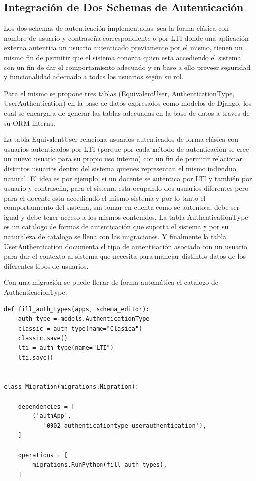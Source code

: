 \subsection{Integración de Dos Schemas de Autenticación}
Los dos schemas de autenticación implementadas, sea la forma clásica con nombre de usuario y contraseña correspondiente o por LTI  donde una aplicación externa autentica un usuario autenticado previamente por el mismo, tienen un mismo fin de permitir que el sistema conozca quien esta accediendo el sistema con un fin de dar el comportamiento adecuado y en base a ello proveer seguridad y funcionalidad adecuado a todos los usuarios según su rol.

Para el mismo se propone tres tablas (EquivalentUser, AuthenticationType, UserAuthentication) en la base de datos expresados como modelos de Django, los cual se encargara de generar las tablas adecuadas en la base de datos a traves de su ORM interna.

La tabla EquivalentUser relaciona usuarios autenticados de forma clásica con usuarios autenticados por LTI  (porque por cada método de autenticación se cree un nuevo usuario para su propio uso interno) con un fin de permitir relacionar distintos usuarios dentro del sistema quienes representan el mismo individuo natural. El idea es por ejemplo, si un docente se autentica por LTI  y también por usuario y contraseña, para el sistema esta ocupando dos usuarios diferentes pero para el docente esta accediendo el mismo sistema y por lo tanto el comportamiento del sistema, sin tomar en cuenta como se autentica, debe ser igual y debe tener acceso a los mismos contenidos. La tabla AuthenticationType es un catalogo de formas de autenticación que suporta el sistema y por su naturaleza de catalogo se llena con las migraciones. Y finalmente la tabla UserAuthentication documenta el tipo de autenticación asociado con un usuario para dar el contexto al sistema que necesita para manejar distintos datos de los diferentes tipos de usuarios.

Con una migración se puede llenar de forma automática el catalogo de AuthenticacionType:
\lstset{language=Python}
\begin{lstlisting}
def fill_auth_types(apps, schema_editor):
    auth_type = models.AuthenticationType
    classic = auth_type(name="Clasica")
    classic.save()
    lti = auth_type(name="LTI")
    lti.save()


class Migration(migrations.Migration):

    dependencies = [
        ('authApp',
           '0002_authenticationtype_userauthentication'),
    ]

    operations = [
        migrations.RunPython(fill_auth_types),
    ]
\end{lstlisting}
\lstset{language=Bash}

